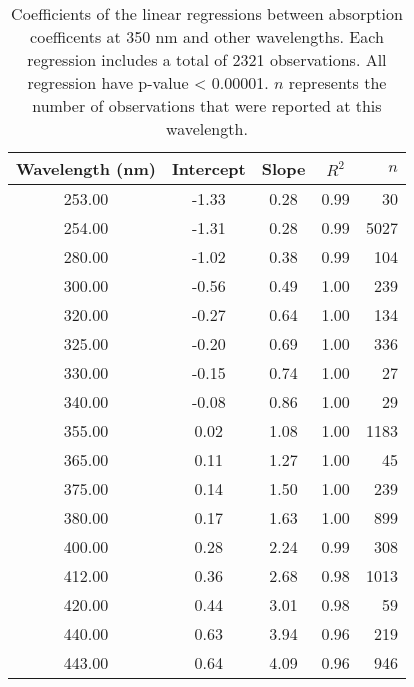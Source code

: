 \begin{table}[ht]
\centering
\begin{tabular}{ccccr}
  \hline
Wavelength (nm) & Intercept & Slope & $R^2$ & $n$ \\ 
  \hline
253.00 & -1.33 & 0.28 & 0.99 &  30 \\ 
  254.00 & -1.31 & 0.28 & 0.99 & 5027 \\ 
  280.00 & -1.02 & 0.38 & 0.99 & 104 \\ 
  300.00 & -0.56 & 0.49 & 1.00 & 239 \\ 
  320.00 & -0.27 & 0.64 & 1.00 & 134 \\ 
  325.00 & -0.20 & 0.69 & 1.00 & 336 \\ 
  330.00 & -0.15 & 0.74 & 1.00 &  27 \\ 
  340.00 & -0.08 & 0.86 & 1.00 &  29 \\ 
  355.00 & 0.02 & 1.08 & 1.00 & 1183 \\ 
  365.00 & 0.11 & 1.27 & 1.00 &  45 \\ 
  375.00 & 0.14 & 1.50 & 1.00 & 239 \\ 
  380.00 & 0.17 & 1.63 & 1.00 & 899 \\ 
  400.00 & 0.28 & 2.24 & 0.99 & 308 \\ 
  412.00 & 0.36 & 2.68 & 0.98 & 1013 \\ 
  420.00 & 0.44 & 3.01 & 0.98 &  59 \\ 
  440.00 & 0.63 & 3.94 & 0.96 & 219 \\ 
  443.00 & 0.64 & 4.09 & 0.96 & 946 \\ 
   \hline
\end{tabular}
\caption{Coefficients of the linear regressions between absorption 
coefficents at 350 nm and other wavelengths. Each regression includes a total 
of 2321 observations. All regression have p-value < 0.00001.  $n$ represents 
the number of observations that were reported at this wavelength.} 
\end{table}
